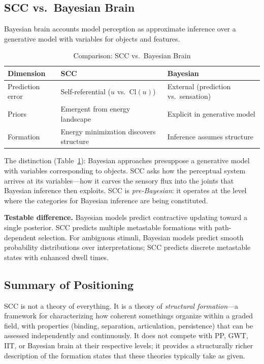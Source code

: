 \documentclass[lettersize,journal]{IEEEtran}
\begin{document}
\subsection{SCC vs.\ Bayesian Brain}

Bayesian brain accounts \cite{knill2004bayesian,lee2003hierarchical} model perception as approximate inference over a generative model with variables for objects and features.

\begin{table}[!t]
\centering
\caption{Comparison: SCC vs.\ Bayesian Brain}
\label{tab:bayesian}
\begin{tabular}{p{2.2cm}p{2.8cm}p{2.5cm}}
\toprule
\textbf{Dimension} & \textbf{SCC} & \textbf{Bayesian} \\
\midrule
Prediction error & Self-referential ($u$ vs.\ $\mathrm{Cl}(u)$) & External (prediction vs.\ sensation) \\
\addlinespace
Priors & Emergent from energy landscape & Explicit in generative model \\
\addlinespace
Formation & Energy minimization discovers structure & Inference assumes structure \\
\bottomrule
\end{tabular}
\end{table}

The distinction (Table~\ref{tab:bayesian}): Bayesian approaches presuppose a generative model with variables corresponding to objects. SCC asks how the perceptual system arrives at its variables---how it carves the sensory flux into the joints that Bayesian inference then exploits. SCC is \emph{pre-Bayesian}: it operates at the level where the categories for Bayesian inference are being constituted.

\textbf{Testable difference.} Bayesian models predict contractive updating toward a single posterior. SCC predicts multiple metastable formations with path-dependent selection. For ambiguous stimuli, Bayesian models predict smooth probability distributions over interpretations; SCC predicts discrete metastable states with enhanced dwell times.

\subsection{Summary of Positioning}

SCC is not a theory of everything. It is a theory of \emph{structural formation}---a framework for characterizing how coherent somethings organize within a graded field, with properties (binding, separation, articulation, persistence) that can be assessed independently and continuously. It does not compete with PP, GWT, IIT, or Bayesian brain at their respective levels; it provides a structurally richer description of the formation states that these theories typically take as given.
\end{document}
